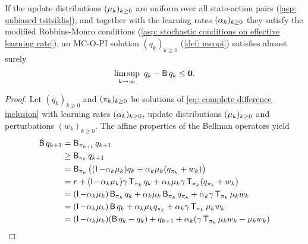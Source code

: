 \begin{lemma}
\label{thm: c(q) goes to zero}
If the update distributions $(\mu_k)_{k \geq 0}$ are uniform over all state-action pairs (\autoref{asp: unbiased tsitsiklis}),
and together with the learning rates $(\alpha_k)_{k \geq 0}$ they satisfy the modified Robbins-Monro conditions (\autoref{asp: stochastic conditions on effective learning rate}),
an MC-O-PI solution $(q_k)_{k \geq 0}$ (\autoref{def: mcopi}) satisfies almost surely
\begin{align}
\label{eq: condition tsitsiklis eventual contract}
    \limsup_{k \to \infty} \ q_k - \operatorname{\mathsf{B}} q_k \leq \mathbf{0} .
\end{align}
\end{lemma}
\begin{proof}
    Let $(q_k)_{k \ge 0}$ and $(\pi_k)_{k \ge 0}$ be solutions of \eqref{eq: complete difference inclusion} with 
    learning rates $(\alpha_k)_{k \ge 0}$, update distributions $(\mu_k)_{k \ge 0}$ and perturbations $(w_k)_{k \ge 0}$.
    The affine properties of the Bellman operators yield
    \begin{align}
        \nonumber
        \operatorname{\mathsf{B}} q_{{k+1}} &= \operatorname{\mathsf{B}}_{\pi_{{k+1}}} q_{{k+1}}
        \\
        \nonumber
        &\geq \operatorname{\mathsf{B}}_{\pi_k} q_{{k+1}}
        \\
        \nonumber
        &= \operatorname{\mathsf{B}}_{\pi_k} \big( (\operatorname{\mathsf{I}}- \alpha_k \mu_k) q_k + \alpha_k \mu_k (q_{\pi_k}+w_k) \big)
        \\
        \label{eq: tsitsiklis commutation}
        &= r + (\operatorname{\mathsf{I}}-\alpha_k \mu_k) \gamma \operatorname{\mathsf{T}}_{\pi_k} q_k + \alpha_k \mu_k \gamma \operatorname{\mathsf{T}}_{\pi_k} ( q_{\pi_k} + w_k)
        \\
        \nonumber
        &= (\operatorname{\mathsf{I}}-\alpha_k \mu_k) \operatorname{\mathsf{B}}_{\pi_k} q_k + \alpha_k \mu_k \operatorname{\mathsf{B}}_{\pi_k} q_{\pi_k} + \alpha_k \gamma \operatorname{\mathsf{T}}_{\pi_k} \mu_k w_k
        \\
        \nonumber
        &= (\operatorname{\mathsf{I}}-\alpha_k \mu_k) \operatorname{\mathsf{B}} q_k + \alpha_k \mu_k q_{\pi_k} + \alpha_k \gamma \operatorname{\mathsf{T}}_{\pi_k} \mu_k w_k
        \\
        \nonumber
        &= (\operatorname{\mathsf{I}}-\alpha_k \mu_k) (\operatorname{\mathsf{B}} q_k - q_k) + q_{{k+1}} + \alpha_k (\gamma \operatorname{\mathsf{T}}_{\pi_k} \mu_k w_k -  \mu_k w_k) 
    \end{align}

\end{proof}
